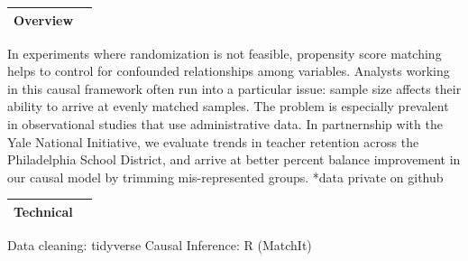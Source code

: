 \documentclass[
]{article}
\begin{document}
\begin{longtable}[]{@{}lr@{}}
\toprule
Overview & \\
\midrule
\endhead
\bottomrule
\end{longtable}

In experiments where randomization is not feasible, propensity score
matching helps to control for confounded relationships among variables.
Analysts working in this causal framework often run into a particular
issue: sample size affects their ability to arrive at evenly matched
samples. The problem is especially prevalent in observational studies
that use administrative data. In partnernship with the Yale National
Initiative, we evaluate trends in teacher retention across the
Philadelphia School District, and arrive at better percent balance
improvement in our causal model by trimming mis-represented groups.
*data private on github

\begin{longtable}[]{@{}lr@{}}
\toprule
Technical & \\
\midrule
\endhead
\bottomrule
\end{longtable}

Data cleaning: tidyverse Causal Inference: R (MatchIt)
\end{document}
